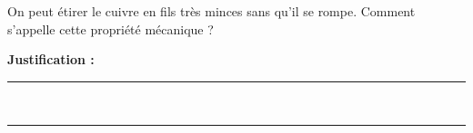 On peut étirer le cuivre en fils très minces sans qu'il se rompe. Comment s'appelle cette propriété mécanique ?

\choices

\noindent\textbf{Justification :} \hrulefill \\[2.5ex]
\rule{\linewidth}{0.4pt} \\[2.5ex]
\rule{\linewidth}{0.4pt}
\vfill
